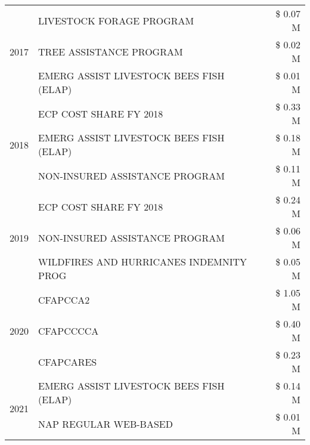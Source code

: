 \begin{tabular}{llr}
\cline{1-3}
\multirow[t]{3}{*}{2017} & LIVESTOCK FORAGE PROGRAM & \$ 0.07 M \\
 & TREE ASSISTANCE PROGRAM & \$ 0.02 M \\
 & EMERG ASSIST LIVESTOCK BEES FISH (ELAP) & \$ 0.01 M \\
\cline{1-3}
\multirow[t]{3}{*}{2018} & ECP COST SHARE FY 2018 & \$ 0.33 M \\
 & EMERG ASSIST LIVESTOCK BEES FISH (ELAP) & \$ 0.18 M \\
 & NON-INSURED ASSISTANCE PROGRAM & \$ 0.11 M \\
\cline{1-3}
\multirow[t]{3}{*}{2019} & ECP COST SHARE FY 2018 & \$ 0.24 M \\
 & NON-INSURED ASSISTANCE PROGRAM & \$ 0.06 M \\
 & WILDFIRES AND HURRICANES INDEMNITY PROG & \$ 0.05 M \\
\cline{1-3}
\multirow[t]{3}{*}{2020} & CFAPCCA2 & \$ 1.05 M \\
 & CFAPCCCCA & \$ 0.40 M \\
 & CFAPCARES & \$ 0.23 M \\
\cline{1-3}
\multirow[t]{2}{*}{2021} & EMERG ASSIST LIVESTOCK BEES FISH (ELAP) & \$ 0.14 M \\
 & NAP REGULAR WEB-BASED & \$ 0.01 M \\
\cline{1-3}
\bottomrule
\end{tabular}
